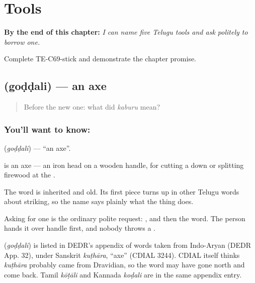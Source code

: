 
\chapter{Tools}
\label{ch:te-tools}

\begin{chapteropening}
\textbf{By the end of this chapter:} \emph{I can name five Telugu tools and ask politely to borrow one.}

Complete TE-C69-stick and demonstrate the chapter promise.
\end{chapteropening}

\section[\texorpdfstring{\te{గొడ్డలి} (goḍḍali)}{గొడ్డలి (goḍḍali)}]{ (goḍḍali) — an axe}

\label{lesson:TE-C69-axe}



\begin{quote}
Before the new one: what did \emph{kaburu} mean?
\end{quote}

\subsection*{You'll want to know: }
\textbf{} (\emph{goḍḍali}) — \textquotedblleft{}an axe\textquotedblright{}.

 is an axe — an iron head on a wooden handle, for cutting a  down or splitting firewood at the .

The word is inherited and old. Its first piece turns up in other Telugu words about striking, so the name says plainly what the thing does.

Asking for one is the ordinary polite request: , and then the word. The person hands it over handle first, and nobody throws a .

\begin{cousinweb}
\textbf{} (\emph{goḍḍali}) is listed in DEDR's appendix of words taken from Indo-Aryan (DEDR App. 32), under Sanskrit \emph{kuṭhāra}, \textquotedblleft{}axe\textquotedblright{} (CDIAL 3244). CDIAL itself thinks \emph{kuṭhāra} probably came from Dravidian, so the word may have gone north and come back. Tamil \emph{kōṭāli} and Kannada \emph{koḍali} are in the same appendix entry.
\end{cousinweb}

